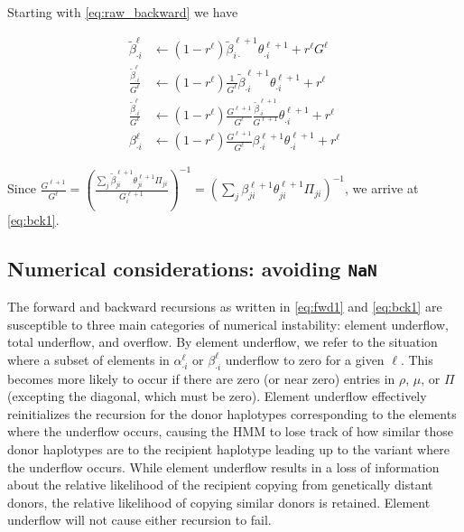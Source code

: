 \documentclass[a4paper]{article}
\begin{document}
Starting with \eqref{eq:raw_backward} we have

\begin{align}
	\tilde{\beta}_{\cdot i}^{\ell} &\gets \left( 1- r^{\ell}\right) \tilde{\beta}_{i\cdot}^{\ell+1} \theta^{\ell+1}_{\cdot i} + r^{\ell} G^\ell \nonumber \\
	\frac{\tilde{\beta}_{\cdot i}^{\ell}}{G^{\ell}} &\gets \left( 1- r^{\ell}\right) \frac{1}{G^{\ell}} \tilde{\beta}_{\cdot i}^{\ell+1} \theta^{\ell+1}_{\cdot i} + r^\ell \nonumber \\
	\frac{\tilde{\beta}_{\cdot i}^{\ell}}{ G^{\ell}} &\gets \left( 1- r^{\ell}\right) \frac{G^{\ell+1}}{G^{\ell}} \frac{\tilde{\beta}_{\cdot i}^{\ell+1}}{G^{\ell+1}} \theta^{\ell+1}_{\cdot i} + r^\ell \nonumber \\
	\beta_{\cdot i}^{\ell} &\gets \left( 1- r^{\ell}\right) \frac{G^{\ell+1}}{ G^{\ell}} \beta_{\cdot i}^{\ell+1} \theta^{\ell+1}_{\cdot i} + r^\ell \nonumber
\end{align}

Since
\(\frac{G^{\ell+1}}{ G^{\ell}} = \left( \frac{\underset{j}{\sum} \tilde{\beta}_{ji}^{\ell+1}\theta_{ji}^{\ell+1} \Pi_{ji} }{G_i^{\ell+1}}\right)^{-1} = \left(\underset{j}{\sum} \beta_{ji}^{\ell+1}\theta_{ji}^{\ell+1} \Pi_{ji}\right)^{-1}\),
we arrive at \eqref{eq:bck1}.

\subsection[Numerical considerations: avoiding NaN]{Numerical considerations: avoiding \texttt{NaN}}
\label{apx:nan}

The forward and backward recursions as written in \eqref{eq:fwd1} and \eqref{eq:bck1} are susceptible to three main categories of numerical instability: element underflow, total underflow, and overflow.
By element underflow, we refer to the situation where a subset of elements in \(\alpha_{\cdot i}^\ell\) or \(\beta_{\cdot i}^\ell\) underflow to zero for a given \(\ell\).
This becomes more likely to occur if there are zero (or near zero) entries in \(\rho\), \(\mu\), or \(\Pi\) (excepting the diagonal, which must be zero).
Element underflow effectively reinitializes the recursion for the donor haplotypes corresponding to the elements where the underflow occurs, causing the HMM to lose track of how similar those donor haplotypes are
to the recipient haplotype leading up to the variant where the underflow occurs.
While element underflow results in a loss of information about the relative likelihood of the recipient copying from genetically distant donors, the relative likelihood of copying similar donors is retained.
Element underflow will not cause either recursion to fail.
\end{document}
